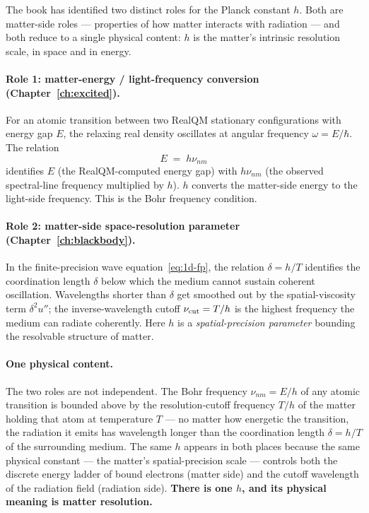 The book has identified two distinct roles for the Planck constant $h$. Both are matter-side roles --- properties of how matter interacts with radiation --- and both reduce to a single physical content: $h$ is the matter's intrinsic resolution scale, in space and in energy.

\paragraph{Role 1: matter-energy / light-frequency conversion (Chapter~\ref{ch:excited}).}
For an atomic transition between two RealQM stationary configurations with energy gap $E$, the relaxing real density oscillates at angular frequency $\omega = E / \hbar$. The relation
\[
E \;=\; h\nu_{nm}
\]
identifies $E$ (the RealQM-computed energy gap) with $h\nu_{nm}$ (the observed spectral-line frequency multiplied by $h$). $h$ converts the matter-side energy to the light-side frequency. This is the Bohr frequency condition.

\paragraph{Role 2: matter-side space-resolution parameter (Chapter~\ref{ch:blackbody}).}
In the finite-precision wave equation~\eqref{eq:1d-fp}, the relation $\delta = h/T$ identifies the coordination length $\delta$ below which the medium cannot sustain coherent oscillation. Wavelengths shorter than $\delta$ get smoothed out by the spatial-viscosity term $\delta^2 u''$; the inverse-wavelength cutoff $\nu_{\rm cut} = T/h$ is the highest frequency the medium can radiate coherently. Here $h$ is a \emph{spatial-precision parameter} bounding the resolvable structure of matter.

\paragraph{One physical content.}
The two roles are not independent. The Bohr frequency $\nu_{nm} = E / h$ of any atomic transition is bounded above by the resolution-cutoff frequency $T/h$ of the matter holding that atom at temperature $T$ --- no matter how energetic the transition, the radiation it emits has wavelength longer than the coordination length $\delta = h/T$ of the surrounding medium. The same $h$ appears in both places because the same physical constant --- the matter's spatial-precision scale --- controls both the discrete energy ladder of bound electrons (matter side) and the cutoff wavelength of the radiation field (radiation side). \textbf{There is one $h$, and its physical meaning is matter resolution.}

